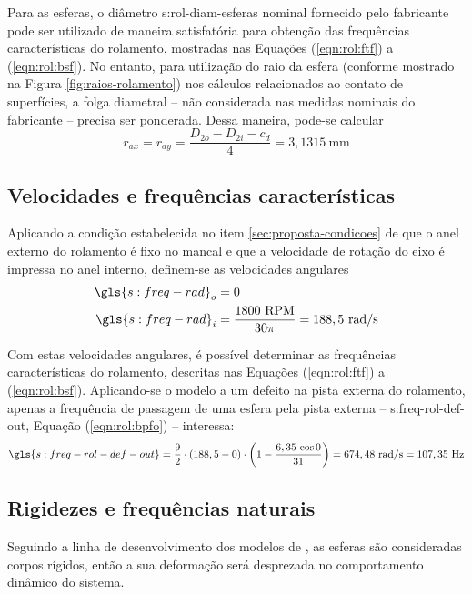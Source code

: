 \documentclass[12pt,oneside,english,brazil,lmodern,siglas,simbolos,cite=num]{ucsmonograph}
\begin{document}
	Para as esferas, o diâmetro \gls{s:rol-diam-esferas} nominal fornecido pelo fabricante pode ser utilizado de maneira satisfatória para obtenção das frequências características do rolamento, mostradas nas Equações (\ref{eqn:rol:ftf}) a (\ref{eqn:rol:bsf}).
	No entanto, para utilização do raio da esfera (conforme mostrado na Figura \ref{fig:raios-rolamento}) nos cálculos relacionados ao contato de superfícies, a folga diametral -- não considerada nas medidas nominais do fabricante -- precisa ser ponderada.
	Dessa maneira, pode-se calcular
	\begin{equation}
		r_{ax} = r_{ay} = \frac{D_{2o} - D_{2i} - c_d}{4} = 3,1315\ \text{mm}
	\end{equation}
	
	\subsection{Velocidades e frequências características}
	Aplicando a condição estabelecida no item \ref{sec:proposta-condicoes} de que o anel externo do rolamento é fixo no mancal e que a velocidade de rotação do eixo é impressa no anel interno, definem-se as velocidades angulares
	\begin{align}
		\gls{s:freq-rad}_o &= 0 \\
		\gls{s:freq-rad}_i &= \frac{1800\ \text{RPM}}{30\pi} = 188,5\ \text{rad/s}
	\end{align}
	
	Com estas velocidades angulares, é possível determinar as frequências características do rolamento, descritas nas Equações (\ref{eqn:rol:ftf}) a (\ref{eqn:rol:bsf}).
	Aplicando-se o modelo a um defeito na pista externa do rolamento, apenas a frequência de passagem de uma esfera pela pista externa -- \gls{s:freq-rol-def-out}, Equação (\ref{eqn:rol:bpfo}) -- interessa:
	\begin{equation*}
		\gls{s:freq-rol-def-out} = \frac{9}{2}\cdot(188,5 - 0)\cdot
		\left( 1 - \frac{6,35\,\cos 0}{31} \right) =
		674,48\ \text{rad/s} =	107,35\ \text{Hz}
	\end{equation*}
	
	\subsection{Rigidezes e frequências naturais}
	Seguindo a linha de desenvolvimento dos modelos de \cite{mcfadden:1984,tandon:1997,sassi:2007,cong:2013}, as esferas são consideradas corpos rígidos, então a sua deformação será desprezada no comportamento dinâmico do sistema.
	
\end{document}
